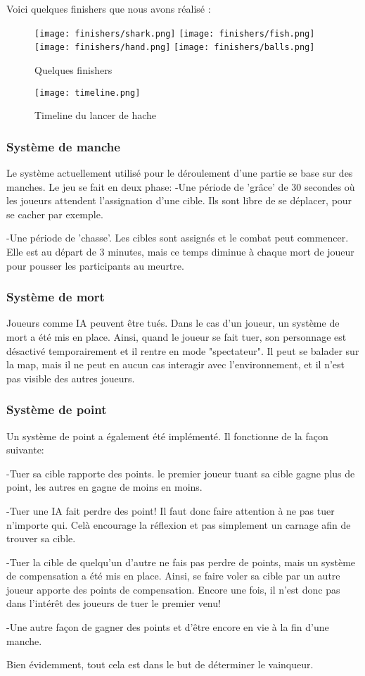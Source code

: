 Voici quelques finishers que nous avons réalisé :

\begin{figure}[hbt!]
    \centering
    \texttt{[image: finishers/shark.png]}
	\texttt{[image: finishers/fish.png]}
	\texttt{[image: finishers/hand.png]}
	\texttt{[image: finishers/balls.png]}
    \caption{Quelques finishers}
\end{figure}

\FloatBarrier
\begin{figure}[hbt!]
    \centering
    \texttt{[image: timeline.png]}
    \caption{Timeline du lancer de hache}
\end{figure}


\subsubsection{Système de manche}
    Le système actuellement utilisé pour le déroulement d'une partie se base sur des manches. Le jeu se fait en deux phase:
    	-Une période de 'grâce' de 30 secondes où les joueurs attendent l'assignation d'une cible. 
	 Ils sont libre de se déplacer, pour se cacher par exemple.

	-Une période de 'chasse'. Les cibles sont assignés et le combat peut commencer. Elle est au départ de 3 minutes, mais ce temps
	 diminue à chaque mort de joueur pour pousser les participants au meurtre.

\subsubsection{Système de mort}
    Joueurs comme IA peuvent être tués. Dans le cas d'un joueur, un système de mort a été mis en place. Ainsi,
    quand le joueur se fait tuer, son personnage est désactivé temporairement et il rentre
    en mode "spectateur". Il peut se balader sur la map, mais il ne peut en aucun cas interagir avec l'environnement,
	et il n'est pas visible des autres joueurs.

\subsubsection{Système de point}
    Un système de point a également été implémenté. Il fonctionne de la façon suivante:
    
	-Tuer sa cible rapporte des points. le premier joueur tuant sa cible gagne plus de point, les autres en gagne de moins en moins.
	
	-Tuer une IA fait perdre des point! Il faut donc faire attention à ne pas tuer n'importe qui. Celà encourage la réflexion et pas 	 simplement un carnage afin de trouver sa cible.
	
	-Tuer la cible de quelqu'un d'autre ne fais pas perdre de points, mais un système de compensation a été mis en place. Ainsi, se 	faire voler sa cible par un autre joueur apporte des points de compensation. Encore une fois, il n'est donc pas dans l'intérêt 
	des joueurs de tuer le premier venu!

	-Une autre façon de gagner des points et d'être encore en vie à la fin d'une manche.

    Bien évidemment, tout cela est dans le but de déterminer le vainqueur.
